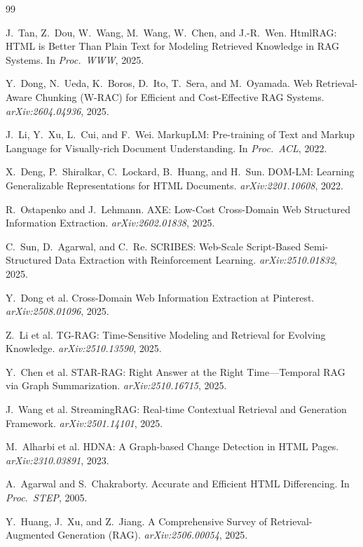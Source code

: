 \documentclass[11pt]{article}
\begin{document}

\begin{thebibliography}{99}

J.~Tan, Z.~Dou, W.~Wang, M.~Wang, W.~Chen, and J.-R.~Wen.
HtmlRAG: HTML is Better Than Plain Text for Modeling Retrieved Knowledge in RAG Systems.
In \emph{Proc.\ WWW}, 2025.

Y.~Dong, N.~Ueda, K.~Boros, D.~Ito, T.~Sera, and M.~Oyamada.
Web Retrieval-Aware Chunking (W-RAC) for Efficient and Cost-Effective RAG Systems.
\emph{arXiv:2604.04936}, 2025.

J.~Li, Y.~Xu, L.~Cui, and F.~Wei.
MarkupLM: Pre-training of Text and Markup Language for Visually-rich Document Understanding.
In \emph{Proc.\ ACL}, 2022.

X.~Deng, P.~Shiralkar, C.~Lockard, B.~Huang, and H.~Sun.
DOM-LM: Learning Generalizable Representations for HTML Documents.
\emph{arXiv:2201.10608}, 2022.

R.~Ostapenko and J.~Lehmann.
AXE: Low-Cost Cross-Domain Web Structured Information Extraction.
\emph{arXiv:2602.01838}, 2025.

C.~Sun, D.~Agarwal, and C.~Re.
SCRIBES: Web-Scale Script-Based Semi-Structured Data Extraction with Reinforcement Learning.
\emph{arXiv:2510.01832}, 2025.

Y.~Dong et al.
Cross-Domain Web Information Extraction at Pinterest.
\emph{arXiv:2508.01096}, 2025.

Z.~Li et al.
TG-RAG: Time-Sensitive Modeling and Retrieval for Evolving Knowledge.
\emph{arXiv:2510.13590}, 2025.

Y.~Chen et al.
STAR-RAG: Right Answer at the Right Time---Temporal RAG via Graph Summarization.
\emph{arXiv:2510.16715}, 2025.

J.~Wang et al.
StreamingRAG: Real-time Contextual Retrieval and Generation Framework.
\emph{arXiv:2501.14101}, 2025.

M.~Alharbi et al.
HDNA: A Graph-based Change Detection in HTML Pages.
\emph{arXiv:2310.03891}, 2023.

A.~Agarwal and S.~Chakraborty.
Accurate and Efficient HTML Differencing.
In \emph{Proc.\ STEP}, 2005.

Y.~Huang, J.~Xu, and Z.~Jiang.
A Comprehensive Survey of Retrieval-Augmented Generation (RAG).
\emph{arXiv:2506.00054}, 2025.


\end{thebibliography}
\end{document}
